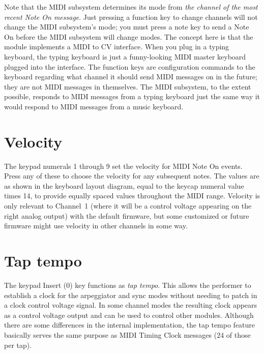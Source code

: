 Note that the MIDI subsystem determines its mode from \emph{the channel of
the most recent Note On message}.  Just pressing a function key to change
channels will not change the MIDI subsystem's mode; you must press a note
key to send a Note On before the MIDI subsystem will change modes.  The
concept here is that the module implements a MIDI to CV interface.  When you
plug in a typing keyboard, the typing keyboard is just a funny-looking MIDI
master keyboard plugged into the interface.  The function keys are
configuration commands to the keyboard regarding what channel it should send
MIDI messages on in the future; they are not MIDI messages in themselves. 
The MIDI subsystem, to the extent possible, responds to MIDI messages from a
typing keyboard just the same way it would respond to MIDI messages from a
music keyboard.


\section{Velocity}

The keypad numerals 1 through 9 set the velocity for MIDI Note On events. 
Press any of these to choose the velocity for any subsequent notes.  The
values are as shown in the keyboard layout diagram, equal to the keycap
numeral value times 14, to provide equally spaced values throughout the MIDI
range.  Velocity is only relevant to Channel~1 (where it will be a control
voltage appearing on the right analog output) with the default firmware, but
some customized or future firmware might use velocity in other channels in
some way.


\section{Tap tempo}

The keypad Insert (0) key functions as \emph{tap tempo}.  This allows the
performer to establish a clock for the arpeggiator and sync modes without
needing to patch in a clock control voltage signal.  In some channel modes
the resulting clock appears as a control voltage output and can be used to
control other modules.  Although there are some differences in the internal
implementation, the tap tempo feature basically serves the same purpose as
MIDI Timing Clock messages (24 of those per tap).

